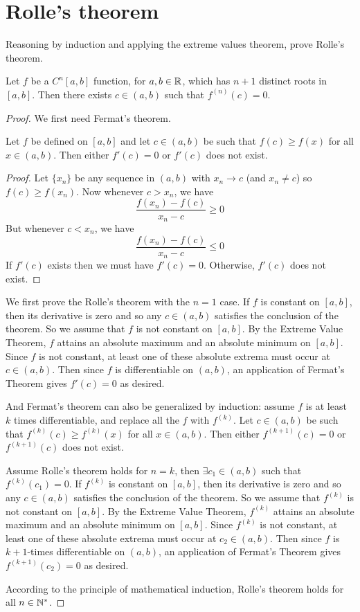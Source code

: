 \section{Rolle's theorem}
Reasoning by induction and applying the extreme values theorem, prove Rolle's theorem.
\begin{theorem}
Let $f$ be a \(C^n[a, b]\) function, for \(a,b\in\mathbb{R}\), which has $n+1$ distinct roots in \([a,b]\).
Then there exists \(c \in (a, b)\) such that \(f^{(n)}(c)=0\).
\end{theorem}
\begin{proof}
We first need Fermat's theorem.
\begin{theorem}
Let $f$ be defined on \([a,b]\) and let \(c\in(a,b)\) be such that \(f(c)\geq f(x)\) for all \(x\in(a,b)\).
Then either \(f'(c)=0\) or \(f'(c)\) does not exist.
\end{theorem}
\begin{proof}
Let \(\{x_n\}\) be any sequence in \((a,b)\) with \(x_n\to c\) (and \(x_n\neq c\)) so \(f(c)\geq f(x_n)\).
Now whenever \(c>x_n\), we have
\[ \frac{f(x_n)-f(c)}{x_n-c}\geq0 \]
But whenever \(c<x_n\), we have
\[ \frac{f(x_n)-f(c)}{x_n-c}\leq0 \]
If \(f'(c)\) exists then we must have \(f'(c)=0\).
Otherwise, \(f'(c)\) does not exist.
\end{proof}
We first prove the Rolle's theorem with the \(n=1\) case.
If $f$ is constant on \([a,b]\), then its derivative is zero and so any \(c\in(a,b)\) satisfies the conclusion of the theorem.
So we assume that $f$ is not constant on \([a,b]\).
By the Extreme Value Theorem, $f$ attains an absolute maximum and an absolute minimum on \([a,b]\).
Since $f$ is not constant, at least one of these absolute extrema must occur at \(c\in(a,b)\).
Then since $f$ is differentiable on \((a,b)\), an application of Fermat's Theorem gives \(f'(c)=0\) as desired.

And Fermat's theorem can also be generalized by induction:
assume $f$ is at least $k$ times differentiable, and replace all the $f$ with \(f^{(k)}\).
Let \(c\in(a,b)\) be such that \(f^{(k)}(c)\geq f^{(k)}(x)\) for all \(x\in(a,b)\).
Then either \(f^{(k+1)}(c)=0\) or \(f^{(k+1)}(c)\) does not exist.

Assume Rolle's theorem holds for \(n=k\), then \(\exists c_1\in(a,b)\) such that \(f^{(k)}(c_1)=0\).
If \(f^{(k)}\) is constant on \([a,b]\), then its derivative is zero and so any \(c\in(a,b)\) satisfies the conclusion of the theorem.
So we assume that \(f^{(k)}\) is not constant on \([a,b]\).
By the Extreme Value Theorem, \(f^{(k)}\) attains an absolute maximum and an absolute minimum on \([a,b]\).
Since \(f^{(k)}\) is not constant, at least one of these absolute extrema must occur at \(c_2\in(a,b)\).
Then since $f$ is \(k+1\)-times differentiable on \((a,b)\), an application of Fermat's Theorem gives \(f^{(k+1)}(c_2)=0\) as desired.

According to the principle of mathematical induction, Rolle's theorem holds for all \(n\in\mathbb{N}^*\).
\end{proof}


